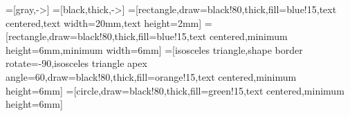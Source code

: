 \documentclass[10pt,handout,notes=show]{beamer}
\begin{document}
\usetikzlibrary{shapes,arrows,positioning,decorations.pathmorphing}
\renewcommand{\textFont}[1]{\footnotesize{#1}}
=[gray,->]
=[black,thick,->]
=[rectangle,draw=black!80,thick,fill=blue!15,text centered,text width=20mm,text height=2mm]
=[rectangle,draw=black!80,thick,fill=blue!15,text centered,minimum height=6mm,minimum width=6mm]
 =[isosceles triangle,shape border rotate=-90,isosceles triangle apex angle=60,draw=black!80,thick,fill=orange!15,text centered,minimum height=6mm]
=[circle,draw=black!80,thick,fill=green!15,text centered,minimum height=6mm]
\end{document}
